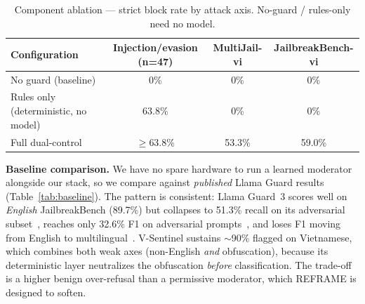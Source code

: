 \documentclass[11pt, a4paper]{article}
\begin{document}
\begin{table}[H]
    \centering
    \caption{Component ablation --- strict block rate by attack axis. No-guard / rules-only need no model.}
    \label{tab:ablation}
    \begin{tabularx}{\textwidth}{l c c c}
        \toprule
        \textbf{Configuration} & \textbf{Injection/evasion (n=47)} & \textbf{MultiJail-vi} & \textbf{JailbreakBench-vi} \\
        \midrule
        No guard (baseline)                  & 0\%          & 0\%    & 0\%    \\
        Rules only (deterministic, no model) & 63.8\%       & 0\%    & 0\%    \\
        Full dual-control                    & $\geq$63.8\% & 53.3\% & 59.0\% \\
        \bottomrule
    \end{tabularx}
\end{table}

\noindent\textbf{Baseline comparison.} We have no spare hardware to run a learned moderator alongside our stack, so we compare against \emph{published} Llama Guard results (Table~\ref{tab:baseline}). The pattern is consistent: Llama Guard~3 scores well on \emph{English} JailbreakBench (89.7\%) but collapses to 51.3\% recall on its adversarial subset~\cite{reflectguard}, reaches only 32.6\% F1 on adversarial prompts~\cite{wildguard}, and loses F1 moving from English to multilingual~\cite{multitox}. V-Sentinel sustains $\sim$90\% flagged on Vietnamese, which combines both weak axes (non-English \emph{and} obfuscation), because its deterministic layer neutralizes the obfuscation \emph{before} classification. The trade-off is a higher benign over-refusal than a permissive moderator, which REFRAME is designed to soften.
\end{document}

